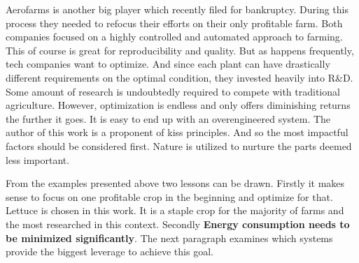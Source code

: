 Aerofarms is another big player which recently filed for bankruptcy.
During this process they needed to refocus their efforts on their only profitable farm.
Both companies focused on a highly controlled and automated approach to farming.
This of course is great for reproducibility and quality.
But as happens frequently, tech companies want to optimize.
And since each plant can have drastically different requirements on the optimal condition, they invested heavily into R\&D.
Some amount of research is undoubtedly required to compete with traditional agriculture.
However, optimization is endless and only offers diminishing returns the further it goes.
It is easy to end up with an overengineered system.
The author of this work is a proponent of \acs{kiss} principles.
And so the most impactful factors should be considered first.
Nature is utilized to nurture the parts deemed less important.

From the examples presented above two lessons can be drawn.
Firstly it makes sense to focus on one profitable crop in the beginning and optimize for that.
Lettuce is chosen in this work.
It is a staple crop for the majority of farms and the most researched in this context.
Secondly \textbf{Energy consumption needs to be minimized significantly}.
The next paragraph examines which systems provide the biggest leverage to achieve this goal.



